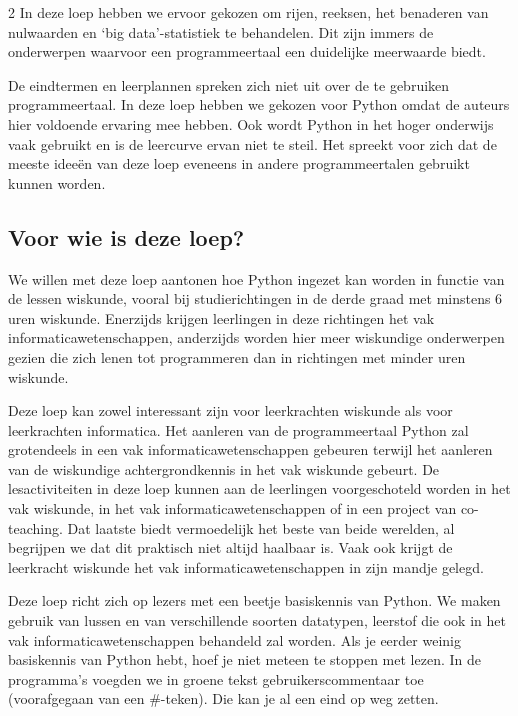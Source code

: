 \begin{multicols}{2}
    In deze loep hebben we ervoor gekozen om rijen, reeksen, het benaderen van nulwaarden en `big data'-statistiek te behandelen. Dit zijn immers de onderwerpen waarvoor een programmeertaal een duidelijke meerwaarde biedt. 
    
    De eindtermen en leerplannen spreken zich niet uit over de te gebruiken programmeertaal. In deze loep hebben we gekozen voor Python omdat de auteurs hier voldoende ervaring mee hebben. Ook wordt Python in het hoger onderwijs vaak gebruikt en is de leercurve ervan niet te steil. Het spreekt voor zich dat de meeste idee\"en van deze loep eveneens in andere programmeertalen gebruikt kunnen worden.
	
    \subsection{Voor wie is deze loep?}
    
    We willen met deze loep aantonen hoe Python ingezet kan worden in functie van de lessen wiskunde, vooral bij studierichtingen in de derde graad met minstens 6 uren wiskunde. Enerzijds krijgen leerlingen in deze richtingen het vak informaticawetenschappen, anderzijds worden hier meer wiskundige onderwerpen gezien die zich lenen tot programmeren dan in richtingen met minder uren wiskunde. 
    
    Deze loep kan zowel interessant zijn voor leerkrachten wiskunde als voor leerkrachten informatica. Het aanleren van de programmeertaal Python zal grotendeels in een vak informaticawetenschappen gebeuren terwijl het aanleren van de wiskundige achtergrondkennis in het vak wiskunde gebeurt. De lesactiviteiten in deze loep kunnen aan de leerlingen voorgeschoteld worden in het vak wiskunde, in het vak informaticawetenschappen of in een project van co-teaching. Dat laatste biedt vermoedelijk het beste van beide werelden, al begrijpen we dat dit praktisch niet altijd haalbaar is. Vaak ook krijgt de leerkracht  wiskunde het vak informaticawetenschappen in zijn mandje gelegd.

   Deze loep richt zich op lezers met een beetje basiskennis van Python. We maken gebruik van lussen en van verschillende soorten datatypen, leerstof die ook in het vak informaticawetenschappen behandeld zal worden. Als je eerder weinig basiskennis van Python hebt, hoef je niet meteen te stoppen met lezen. In de programma's voegden we in groene tekst gebruikerscommentaar toe (voorafgegaan van een \#-teken). Die kan je al een eind op weg zetten.
   

\end{multicols}
